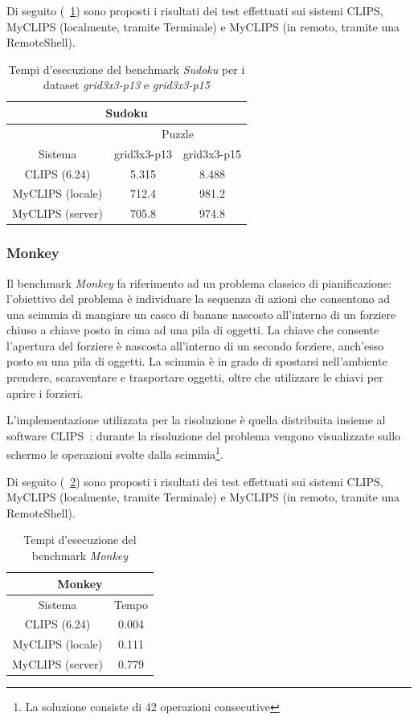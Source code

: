Di seguito (\tablename~\ref{tab:bench-sudoku}) sono proposti i risultati dei test effettuati sui sistemi CLIPS, MyCLIPS (localmente, tramite Terminale) e MyCLIPS (in remoto, tramite una RemoteShell).


\begin{table}[h]
\caption{Tempi d'esecuzione del benchmark \emph{Sudoku} per i dataset \emph{grid3x3-p13} e \emph{grid3x3-p15}}\label{tab:bench-sudoku}
\centering
\begin{tabular}{|c||c|c|}
\hline 
\multicolumn{3}{|c|}{Sudoku} \\ 
\hline 
 & \multicolumn{2}{c|}{Puzzle} \\ 
\hline 
Sistema & grid3x3-p13 & grid3x3-p15 \\ 
\hline\hline
CLIPS (6.24) & 5.315 & 8.488 \\ 
\hline 
MyCLIPS (locale) & 712.4 & 981.2 \\ 
\hline 
MyCLIPS (server) & 705.8 & 974.8 \\ 
\hline 
\end{tabular} 
\end{table}


\subsubsection{Monkey}

Il benchmark \emph{Monkey} fa riferimento ad un problema classico di pianificazione: l'obiettivo del problema è individuare la sequenza di azioni che consentono ad una scimmia di mangiare un casco di banane nascosto all'interno di un forziere chiuso a chiave posto in cima ad una pila di oggetti. La chiave che consente l'apertura del forziere è nascosta all'interno di un secondo forziere, anch'esso posto su una pila di oggetti. La scimmia è in grado di spostarsi nell'ambiente prendere, scaraventare e trasportare oggetti, oltre che utilizzare le chiavi per aprire i forzieri. 

L'implementazione utilizzata per la risoluzione è quella distribuita insieme al software CLIPS~\cite{clipsmab}: durante la risoluzione del problema vengono visualizzate sullo schermo le operazioni svolte dalla scimmia\footnote{La soluzione consiste di 42 operazioni consecutive}.

Di seguito (\tablename~\ref{tab:bench-monkey}) sono proposti i risultati dei test effettuati sui sistemi CLIPS, MyCLIPS (localmente, tramite Terminale) e MyCLIPS (in remoto, tramite una RemoteShell).


\begin{table}[h]
\caption{Tempi d'esecuzione del benchmark \emph{Monkey}}\label{tab:bench-monkey}
\centering
\begin{tabular}{|c||c|}
\hline 
\multicolumn{2}{c|}{Monkey} \\ 
\hline 
Sistema & Tempo \\ 
\hline\hline
CLIPS (6.24) & 0.004 \\ 
\hline 
MyCLIPS (locale) & 0.111 \\ 
\hline 
MyCLIPS (server) & 0.779 \\ 
\hline 
\end{tabular} 
\end{table}

